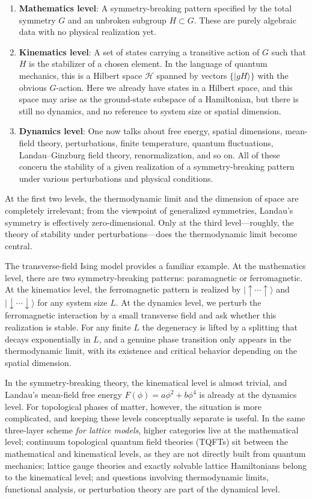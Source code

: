 \documentclass[reprint, amsmath, amssymb, showpacs, floatfix, longbibliography, aps, twocolumn, superscriptaddress, nofootinbib]{revtex4-2}
\theoremstyle{definition}
\begin{document}
\begin{enumerate}
	\item \textbf{Mathematics level}: A symmetry-breaking pattern specified by the total symmetry $G$ and an unbroken subgroup $H\subset G$. These are purely algebraic data with no physical realization yet.
	\item \textbf{Kinematics level}: A set of states carrying a transitive action of $G$ such that $H$ is the stabilizer of a chosen element. In the language of quantum mechanics, this is a Hilbert space $\mathcal{H}$ spanned by vectors 
	$\{|gH\rangle\}$ with the obvious $G$-action. Here we already have states in a Hilbert space, and this space may arise as the ground-state subspace of a Hamiltonian, but there is still no dynamics, and no reference to system size or spatial dimension.
	\item \textbf{	Dynamics level}: One now talks about free energy, spatial dimensions, mean-field theory, perturbations, finite temperature, quantum fluctuations, Landau–Ginzburg field theory, renormalization, and so on. All of these concern the stability of a given realization of a symmetry-breaking pattern under various perturbations and physical conditions.
\end{enumerate}




At the first two levels, the thermodynamic limit and the dimension of space are completely irrelevant; from the viewpoint of generalized symmetries, Landau’s symmetry is effectively zero-dimensional. Only at the third level—roughly, the theory of stability under perturbations—does the thermodynamic limit become central.


The transverse-field Ising model provides a familiar example. At the mathematics level, there are two symmetry-breaking patterns: paramagnetic or ferromagnetic. At the kinematics level, the ferromagnetic pattern is realized by $|\uparrow\cdots\uparrow\rangle$ and $| \downarrow\cdots\downarrow\rangle$ for any system size $L$. At the dynamics level, we perturb the ferromagnetic interaction by a small transverse field and ask whether this realization is stable. For any finite $L$ the degeneracy is lifted by a splitting that decays exponentially in $L$, and a genuine phase transition only appears in the thermodynamic limit, with its existence and critical behavior depending on the spatial dimension.

In the symmetry-breaking theory, the kinematical level is almost trivial, and Landau’s mean-field free energy $F(\phi)=a\phi^2+b\phi^4$ is already at the dynamics level. For topological phases of matter, however, the situation is more complicated, and keeping these levels conceptually separate is useful. In the same three-layer scheme \textit{for lattice models}, higher categories live at the mathematical level; continuum topological quantum field theories (TQFTs) sit between the mathematical and kinematical levels, as they are not directly built from quantum mechanics; lattice gauge theories and exactly solvable lattice Hamiltonians belong to the kinematical level; and questions involving thermodynamic limits, functional analysis, or perturbation theory are part of the dynamical level.
\end{document}
